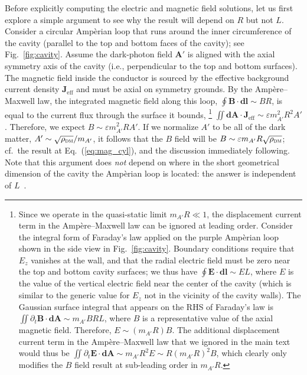 \documentclass[amsmath,amssymb,aps,10pt,prd,letterpaper,nofootinbib,balancelastpage,notitlepage,superscriptaddress,twocolumn,floatfix]{revtex4-2}
\newcommand{\figref}[2][]{Fig{#1}.~\ref{#2}}		%
\renewcommand{\eqref}[2][]{Eq{#1}.~(\ref{eq:#2})}	%
\newcommand{\tsc}[1]{\textsc{#1}}
\begin{document}
Before explicitly computing the electric and magnetic field solutions, let us first explore a simple argument to see why the result will depend on $R$ but not $L$.
Consider a circular Amp\`erian loop that runs around the inner circumference of the cavity (parallel to the top and bottom faces of the cavity); see \figref{fig:cavity}.
Assume the dark-photon field $\bm{A}'$ is aligned with the axial symmetry axis of the cavity (i.e., perpendicular to the top and bottom surfaces).
The magnetic field inside the conductor is sourced by the effective background current density $\bm{J}_\text{eff}$ and must be axial on symmetry grounds.
By the Amp\`ere--Maxwell law, the integrated magnetic field along this loop, $\oint \bm{B}\cdot\bm{dl} \sim BR$, is equal to the current flux through the surface it bounds,%
\footnote{\label{ftnt:displacementCurrent}%
    Since we operate in the quasi-static limit $m_{A'} R \ll 1$, the displacement current term in the Amp\`ere--Maxwell law can be ignored at leading order.
    Consider the integral form of Faraday's law applied on the purple Amp\`erian loop shown in the side view in \figref{fig:cavity}.
    Boundary conditions require that $E_z$ vanishes at the wall, and that the radial electric field must be zero near the top and bottom cavity surfaces; we thus have $\oint \bm{E} \cdot\bm{dl} \sim E L$, where $E$ is the value of the vertical electric field near the center of the cavity (which is similar to the generic value for $E_z$ not in the vicinity of the cavity walls).
    The Gaussian surface integral that appears on the RHS of Faraday's law is $\iint \partial_t \bm{B} \cdot \bm{dA} \sim m_{A'} B R L$, where $B$ is a representative value of the axial magnetic field.
    Therefore, $E \sim (m_{A'}R) B$.
    The additional displacement current term in the Amp\`ere--Maxwell law that we ignored in the main text would thus be $\iint \partial_t \bm{E} \cdot\bm{dA} \sim m_{A'} R^2 E \sim R ( m_{A'} R)^2 B$, which clearly only modifies the $B$ field result at sub-leading order in $m_{A'}R$.
} %
$\iint \bm{dA} \cdot \bm{J}_\text{eff} \sim \varepsilon m_{A'}^2R^2 A'$. 
Therefore, we expect $B \sim \varepsilon m_{A'}^2R A'$.
If we normalize $A'$ to be all of the dark matter, $A' \sim \sqrt{\rho_{\textsc{dm}}}/m_{A'}$, it follows that the $B$ field will be $B \sim \varepsilon m_{A'}R \sqrt{\rho_{\tsc{dm}}}$; cf.~the result at \eqref{mag_cyl}, and the discussion immediately following.
Note that this argument does \emph{not} depend on where in the short geometrical dimension of the cavity the Amp\`erian loop is located: the answer is independent of $L$~\cite{Chaudhuri:2014dla}.
\end{document}
